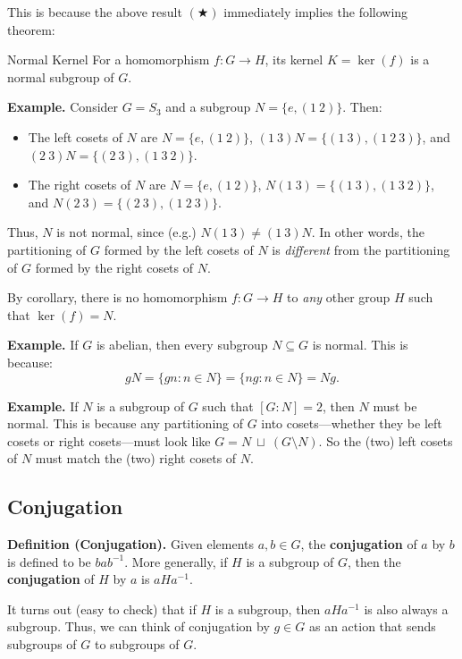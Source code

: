This is because the above result $(\bigstar)$ immediately implies the following theorem:

\begin{theorem}{Normal Kernel}
    For a homomorphism $f: G \to H$, its kernel $K = \ker(f)$ is a normal subgroup of $G$.
\end{theorem}

\textbf{Example.} Consider $G = S_3$ and a subgroup $N = \{e, (1 \ 2)\}$.  Then:
\begin{itemize}
    \item The left cosets of $N$ are $N = \{e, (1 \ 2)\}$, $(1 \ 3)N = \{(1 \ 3), (1 \ 2 \ 3)\}$, and $(2 \ 3)N = \{ (2 \ 3), (1 \ 3 \ 2)\}$.
    \item The right cosets of $N$ are $N = \{e, (1 \ 2)\}$, $N(1 \ 3) = \{(1 \ 3), (1 \ 3 \ 2)\}$, and $N(2 \ 3) = \{(2 \ 3), (1 \ 2 \ 3)\}$.
\end{itemize}
Thus, $N$ is not normal, since (e.g.) $N(1 \ 3) \neq (1 \ 3)N$.  In other words, the partitioning of $G$ formed by the left cosets of $N$ is \emph{different} from the partitioning of $G$ formed by the right cosets of $N$.  

\begin{remark}
    By corollary, there is no homomorphism $f: G \to H$ to \emph{any} other group $H$ such that $\ker(f) = N$.
\end{remark}

\textbf{Example.} If $G$ is abelian, then every subgroup $N \subseteq G$ is normal.  This is because:
\[ gN = \{gn : n \in N\} = \{ng : n \in N\} = Ng. \]

\textbf{Example.} If $N$ is a subgroup of $G$ such that $[G:N] = 2$, then $N$ must be normal.  This is because any partitioning of $G$ into cosets---whether they be left cosets or right cosets---must look like $G = N \  \sqcup \ (G \setminus N)$.  So the (two) left cosets of $N$ must match the (two) right cosets of $N$.

\subsection{Conjugation}

\textbf{Definition (Conjugation).} Given elements $a, b \in G$, the \textbf{conjugation} of $a$ by $b$ is defined to be $bab^{-1}$.  More generally, if $H$ is a subgroup of $G$, then the \textbf{conjugation} of $H$ by $a$ is $aHa^{-1}$.

It turns out (easy to check) that if $H$ is a subgroup, then $aHa^{-1}$ is also always a subgroup.  Thus, we can think of conjugation by $g \in G$ as an action that sends subgroups of $G$ to subgroups of $G$.

